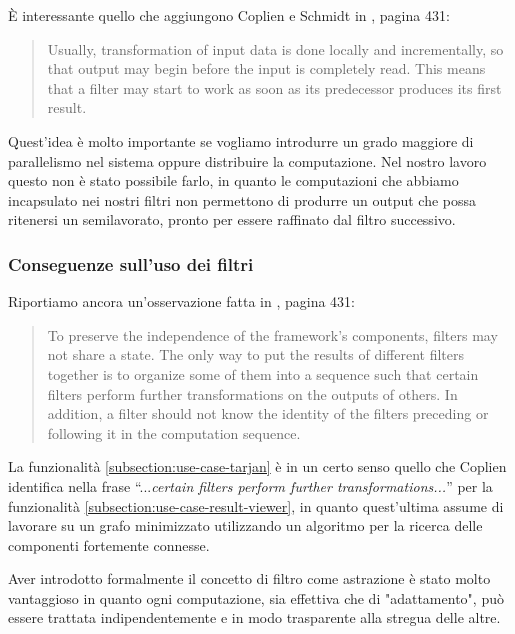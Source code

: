 \`E interessante quello che aggiungono Coplien e Schmidt in
\cite{PLOPD}, pagina 431:
\begin{quotation}
  Usually, transformation of input data is done locally and
  incrementally, so that output may begin before the input is
  completely read. This means that a filter may start to work as soon
  as its predecessor produces its first result.
\end{quotation}
Quest'idea \`e molto importante se vogliamo introdurre un grado
maggiore di parallelismo nel sistema oppure distribuire la
computazione. Nel nostro lavoro questo non \`e stato possibile farlo,
in quanto le computazioni che abbiamo incapsulato nei nostri filtri
non permettono di produrre un output che possa ritenersi un
semilavorato, pronto per essere raffinato dal filtro successivo.

\subsubsection{Conseguenze sull'uso dei filtri}
Riportiamo ancora un'osservazione fatta in \cite{PLOPD}, pagina 431:
\begin{quotation}
  To preserve the independence of the framework's components, filters
  may not share a state. The only way to put the results of different
  filters together is to organize some of them into a sequence such
  that certain filters perform further transformations on the outputs
  of others. In addition, a filter should not know the identity of the
  filters preceding or following it in the computation sequence.
\end{quotation}
La funzionalit\`a \ref{subsection:use-case-tarjan} \`e in un certo
senso quello che Coplien identifica nella frase ``...\emph{certain
  filters perform further transformations...}'' per la funzionalit\`a
\ref{subsection:use-case-result-viewer}, in quanto quest'ultima assume
di lavorare su un grafo minimizzato utilizzando un algoritmo per la
ricerca delle componenti fortemente connesse.

Aver introdotto formalmente il concetto di filtro come astrazione \`e
stato molto vantaggioso in quanto ogni computazione, sia effettiva che
di "adattamento", pu\`o essere trattata indipendentemente e in modo
trasparente alla stregua delle altre.

